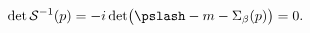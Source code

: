 \begin{equation}
\label{eq:pole_cond}
\det\mathcal{S}^{-1}(p)=-i\det\bigl(\pslash-m-\Sigma_\beta(p)\bigr)=0.
\end{equation}

